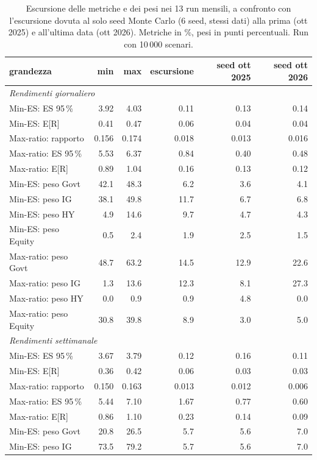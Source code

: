 \begin{table}[htbp]\centering\small\setlength{\tabcolsep}{3.5pt}
\caption{Escursione delle metriche e dei pesi nei 13 run mensili, a confronto con l'escursione dovuta al solo seed Monte Carlo (6 seed, stessi dati) alla prima (ott 2025) e all'ultima data (ott 2026). Metriche in \%, pesi in punti percentuali. Run con 10\,000 scenari.}\label{tab:summary_10k}
\begin{tabular}{lrrrrr}\toprule
grandezza & min & max & escursione & seed ott 2025 & seed ott 2026 \\\midrule
\multicolumn{6}{l}{\emph{Rendimenti giornaliero}} \\
Min-ES: ES 95\,\% & 3.92 & 4.03 & 0.11 & 0.13 & 0.14 \\
Min-ES: E[R] & 0.41 & 0.47 & 0.06 & 0.04 & 0.04 \\
Max-ratio: rapporto & 0.156 & 0.174 & 0.018 & 0.013 & 0.016 \\
Max-ratio: ES 95\,\% & 5.53 & 6.37 & 0.84 & 0.40 & 0.48 \\
Max-ratio: E[R] & 0.89 & 1.04 & 0.16 & 0.13 & 0.12 \\
Min-ES: peso Govt & 42.1 & 48.3 & 6.2 & 3.6 & 4.1 \\
Min-ES: peso IG & 38.1 & 49.8 & 11.7 & 6.7 & 6.8 \\
Min-ES: peso HY & 4.9 & 14.6 & 9.7 & 4.7 & 4.3 \\
Min-ES: peso Equity & 0.5 & 2.4 & 1.9 & 2.5 & 1.5 \\
Max-ratio: peso Govt & 48.7 & 63.2 & 14.5 & 12.9 & 22.6 \\
Max-ratio: peso IG & 1.3 & 13.6 & 12.3 & 8.1 & 27.3 \\
Max-ratio: peso HY & 0.0 & 0.9 & 0.9 & 4.8 & 0.0 \\
Max-ratio: peso Equity & 30.8 & 39.8 & 8.9 & 3.0 & 5.0 \\
\multicolumn{6}{l}{\emph{Rendimenti settimanale}} \\
Min-ES: ES 95\,\% & 3.67 & 3.79 & 0.12 & 0.16 & 0.11 \\
Min-ES: E[R] & 0.36 & 0.42 & 0.06 & 0.03 & 0.03 \\
Max-ratio: rapporto & 0.150 & 0.163 & 0.013 & 0.012 & 0.006 \\
Max-ratio: ES 95\,\% & 5.44 & 7.10 & 1.67 & 0.77 & 0.60 \\
Max-ratio: E[R] & 0.86 & 1.10 & 0.23 & 0.14 & 0.09 \\
Min-ES: peso Govt & 20.8 & 26.5 & 5.7 & 5.6 & 7.0 \\
Min-ES: peso IG & 73.5 & 79.2 & 5.7 & 5.6 & 7.0 \\

\end{tabular}
\end{table}
